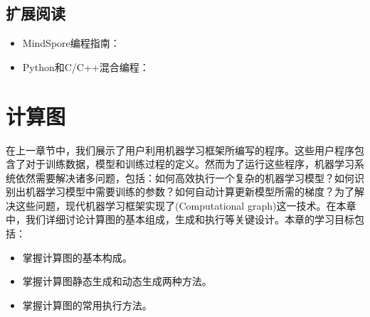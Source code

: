 \documentclass[letterpaper,10pt,english]{sphinxmanual}
\begin{document}
\section{扩展阅读}
\label{\detokenize{chapter_programming_interface/summary:id2}}\begin{itemize}
\item {} 
\sphinxAtStartPar
MindSpore编程指南：%
\begin{footnote}[2]\sphinxAtStartFootnote
{}
%
\end{footnote}

\item {} 
\sphinxAtStartPar
Python和C/C++混合编程：%
\begin{footnote}[3]\sphinxAtStartFootnote
{}
%
\end{footnote}

\end{itemize}


\chapter{计算图}
\label{\detokenize{chapter_computational_graph/index:id1}}\label{\detokenize{chapter_computational_graph/index::doc}}
\sphinxAtStartPar
在上一章节中，我们展示了用户利用机器学习框架所编写的程序。这些用户程序包含了对于训练数据，模型和训练过程的定义。然而为了运行这些程序，机器学习系统依然需要解决诸多问题，包括：如何高效执行一个复杂的机器学习模型？如何识别出机器学习模型中需要训练的参数？如何自动计算更新模型所需的梯度？为了解决这些问题，现代机器学习框架实现了(Computational
graph)这一技术。在本章中，我们详细讨论计算图的基本组成，生成和执行等关键设计。本章的学习目标包括：
\begin{itemize}
\item {} 
\sphinxAtStartPar
掌握计算图的基本构成。

\item {} 
\sphinxAtStartPar
掌握计算图静态生成和动态生成两种方法。

\item {} 
\sphinxAtStartPar
掌握计算图的常用执行方法。

\end{itemize}
\end{document}
